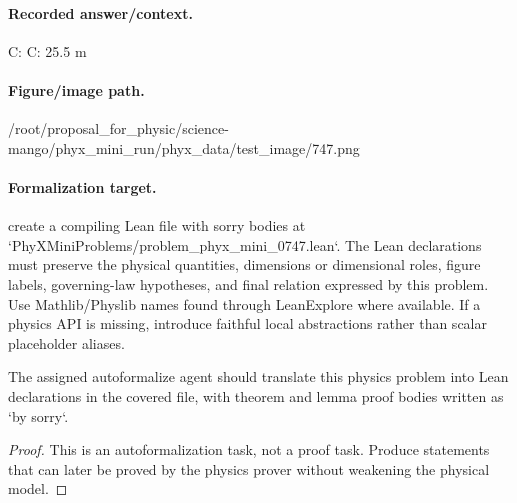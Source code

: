 \paragraph{Recorded answer/context.}
C: C: 25.5 m

\paragraph{Figure/image path.}
/root/proposal\_for\_physic/science-mango/phyx\_mini\_run/phyx\_data/test\_image/747.png

\paragraph{Formalization target.}
create a compiling Lean file with sorry bodies at `PhyXMiniProblems/problem\_phyx\_mini\_0747.lean`. The Lean declarations must preserve the physical quantities, dimensions or dimensional roles, figure labels, governing-law hypotheses, and final relation expressed by this problem.
Use Mathlib/Physlib names found through LeanExplore where available. If a physics API is missing, introduce faithful local abstractions rather than scalar placeholder aliases.

\begin{theorem}
\label{thm:physics:phyx_mini_0747:target}
The assigned autoformalize agent should translate this physics problem into Lean declarations in the covered file, with theorem and lemma proof bodies written as `by sorry`.
\end{theorem}
\begin{proof}
This is an autoformalization task, not a proof task. Produce statements that can later be proved by the physics prover without weakening the physical model.
\end{proof}

